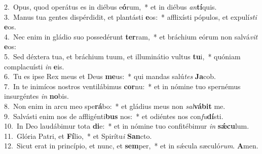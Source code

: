 {2.~}Opus, quod operátus es in diébus e\textbf{ó}rum,~* et in diébus \textit{an}\textbf{tí}quis.\\
{3.~}Manus tua gentes dispérdidit, et plantásti \textbf{e}os:~* afflixísti pópulos, et expulí\textit{sti} \textbf{e}os.\\
{4.~}Nec enim in gládio suo possedérunt \textbf{ter}ram,~* et bráchium eórum non salvá\textit{vit} \textbf{e}os:\\
{5.~}Sed déxtera tua, et bráchium tuum, et illuminátio vultus \textbf{tu}i,~* quóniam complacuísti \textit{in} \textbf{e}is.\\
{6.~}Tu es ipse Rex meus et Deus \textbf{me}us:~* qui mandas salú\textit{tes} \textbf{Ja}cob.\\
{7.~}In te inimícos nostros ventilábimus \textbf{cor}nu:~* et in nómine tuo spernémus insurgéntes \textit{in} \textbf{no}bis.\\
{8.~}Non enim in arcu meo spe\textbf{rá}bo:~* et gládius meus non \textit{sal}\textbf{vá}\textbf{bit} me.\\
{9.~}Salvásti enim nos de affligénti\textbf{bus} nos:~* et odiéntes nos con\textit{fu}\textbf{dí}sti.\\
{10.~}In Deo laudábimur tota \textbf{di}e:~* et in nómine tuo confitébimur \textit{in} \textbf{sǽ}\textbf{cu}lum.\\
{11.~}Glória Patri, et \textbf{Fí}lio,~* et Spirítu\textit{i} \textbf{San}cto.\\
{12.~}Sicut erat in princípio, et nunc, et \textbf{sem}per,~* et in sǽcula sæculó\textit{rum}. \textbf{A}men.\\
